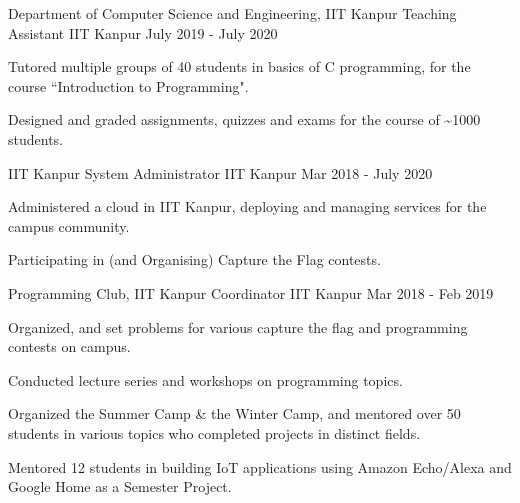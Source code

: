 

\begin{cventries}

  \extraentry
  {Department of Computer Science and Engineering, IIT Kanpur}
  {Teaching Assistant}
  {IIT Kanpur}
  {July 2019 - July 2020}
  {
    \begin{cvitems}
      \item Tutored multiple groups of 40 students in basics of C programming, for the course ``Introduction to Programming".
      \item Designed and graded assignments, quizzes and exams for the course of \textasciitilde 1000 students.
    \end{cvitems}
  }

  \extraentry
  {IIT Kanpur}
  {System Administrator}
  {IIT Kanpur}
  {Mar 2018 - July 2020}
  {
    \begin{cvitems}
      \item Administered a cloud in IIT Kanpur, deploying and managing services for the campus community.
      \item Participating in (and Organising) Capture the Flag contests.
    \end{cvitems}
  }

  \extraentry
  {Programming Club, IIT Kanpur}
  {Coordinator}
  {IIT Kanpur}
  {Mar 2018 - Feb 2019}
  {
    \begin{cvitems}
      \item Organized, and set problems for various capture the flag and programming contests on campus.
      \item Conducted lecture series and workshops on programming topics.
      \item Organized the Summer Camp \& the Winter Camp, and mentored over 50 students in various topics who completed projects in distinct fields.
      \item Mentored 12 students in building IoT applications using Amazon Echo/Alexa and Google Home as a Semester Project.
    \end{cvitems}
  }


\end{cventries}
